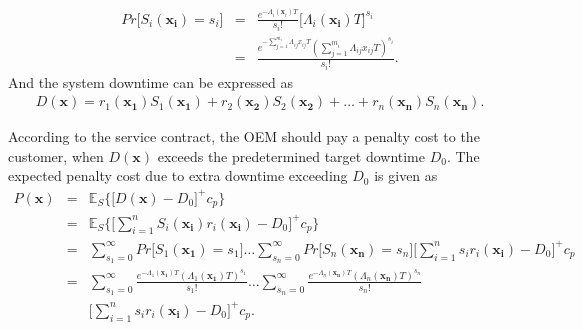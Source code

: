 \documentclass[preprint,12pt]{elsarticle}
\begin{document}
\begin {eqnarray}
Pr\bigg[S_{i}(\boldsymbol{x_i})=s_{i}\bigg]&=&\frac{e^{-\Lambda_{i}(\boldsymbol x_{i})T}}{s_{i}!}{\bigg[\Lambda_{i}(\boldsymbol{x_{i}})T\bigg]}^{s_{i}} \nonumber\\
&=& \frac{e^{-\sum_{j=1}^{m_{i}}{\Lambda_{ij}x_{ij}T}}(\sum_{j=1}^{m_{i}}{\Lambda_{ij}x_{ij}T})^{s_{i}}}{s_{i}!}.
\end {eqnarray}
And the system downtime can be expressed as
\begin{eqnarray}
D(\boldsymbol{x})= r_{1}(\boldsymbol{x_{1}})S_{1}(\boldsymbol{x_{1}})+r_{2}(\boldsymbol{x_{2}})S_{2}(\boldsymbol{x_{2}})+\ldots+r_{n}(\boldsymbol{x_{n}})S_{n}(\boldsymbol{x_{n}}).
\label{D}
\end{eqnarray}

According to the service contract, the OEM should pay a penalty cost to the customer, when $D(\boldsymbol{x})$ exceeds the predetermined target downtime $D_{0}$. The expected penalty cost due to extra downtime exceeding $D_{0}$ is given as
\begin{eqnarray}
P(\boldsymbol{x})& = & \mathbb{E}_{S}\bigg\{\bigg[D(\boldsymbol{x})-D_{0}\bigg]^{+} c_{p} \bigg\} \nonumber\\
&=& \mathbb{E}_{S}\bigg\{\bigg[\sum_{i=1}^{n}{S_{i}(\boldsymbol{x_{i}})r_{i}(\boldsymbol{x_i})}-D_{0}\bigg]^{+} c_{p} \bigg\} \nonumber\\
&=&\sum_{s_{1}=0}^{\infty}{Pr\bigg[S_{1}(\boldsymbol{x_{1}})=s_{1}\bigg]}\dots\sum_{s_{n}=0}^{\infty}{Pr\bigg[S_{n}(\boldsymbol{x_{n}})=s_{n}\bigg]} \bigg[\sum_{i=1}^{n}{s_{i}r_{i}(\boldsymbol{x_{i}})}-D_{0}\bigg]^{+}c_{p} \nonumber\\
&=& \sum_{s_{1}=0}^{\infty}{\frac{e^{-\Lambda_{1}(\boldsymbol{x_{1}})T}(\Lambda_{1}(\boldsymbol{x_{1}})T)^{s_{1}}}{s_{1}!}}\dots\sum_{s_{n}=0}^{\infty}{\frac{e^{-\Lambda_{n}(\boldsymbol{x_{n}})T}(\Lambda_{n}(\boldsymbol{x_{n}})T)^{s_{n}}}{s_{n}!}} \nonumber\\
 &&\bigg[\sum_{i=1}^{n}{s_{i}r_{i}(\boldsymbol{x_{i}})}-D_{0}\bigg]^{+}c_{p}.
\end{eqnarray}
\end{document}
